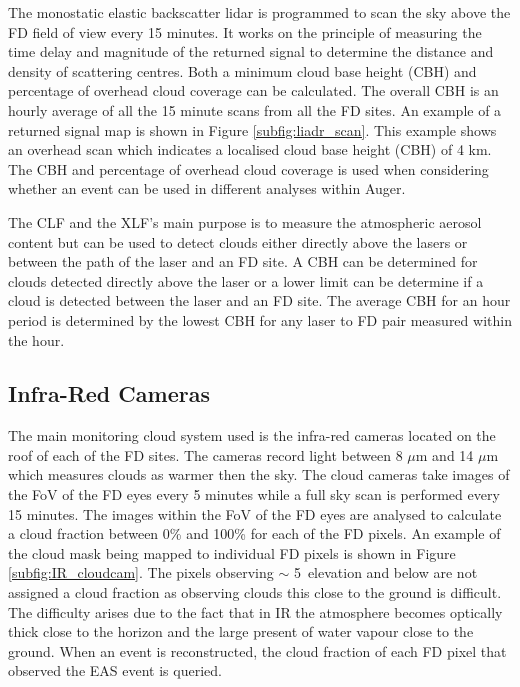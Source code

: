 The monostatic elastic backscatter lidar is programmed to scan the sky above the FD field of view every 15 minutes. It works on the principle of measuring the time delay and magnitude of the returned signal to determine the distance and density of scattering centres. Both a minimum cloud base height (CBH) and percentage of overhead cloud coverage can be calculated. The overall CBH is an hourly average of all the 15 minute scans from all the FD sites. An example of a returned signal map is shown in Figure \ref{subfig:liadr_scan}. This example shows an overhead scan which indicates a localised cloud base height (CBH) of 4 km. The CBH and percentage of overhead cloud coverage is used when considering whether an event can be used in different analyses within Auger.

The CLF and the XLF's main purpose is to measure the atmospheric aerosol content but can be used to detect clouds either directly above the lasers or between the path of the laser and an FD site. A CBH can be determined for clouds detected directly above the laser or a lower limit can be determine if a cloud is detected between the laser and an FD site. The average CBH for an hour period is determined by the lowest CBH for any laser to FD pair measured within the hour.


\subsection{Infra-Red Cameras}

The main monitoring cloud system used is the infra-red cameras located on the roof of each of the FD sites. The cameras record light between 8 $\mu$m and 14 $\mu$m which measures clouds as warmer then the sky. The cloud cameras take images of the FoV of the FD eyes every 5 minutes while a full sky scan is performed every 15 minutes. The images within the FoV of the FD eyes are analysed to calculate a cloud fraction between 0\% and 100\% for each of the FD pixels. An example of the cloud mask being mapped to individual FD pixels is shown in Figure \ref{subfig:IR_cloudcam}. The pixels observing $\sim$ 5\textdegree \ elevation and below are not assigned a cloud fraction as observing clouds this close to the ground is difficult. The difficulty arises due to the fact that in IR the atmosphere becomes optically thick close to the horizon and the large present of water vapour close to the ground. When an event is reconstructed, the cloud fraction of each FD pixel that observed the EAS event is queried.

